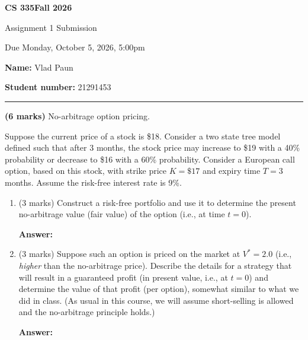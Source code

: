 \documentclass[11pt]{article}
\newcounter{problem}
\newenvironment{problem}{%
    \refstepcounter{problem}%
    \Needspace{7\baselineskip}%
    \par\vspace{0.7em}%
    \noindent\textcolor{courseblue}{\rule{\textwidth}{0.4pt}}%
    \par\vspace{0.5em}%
    \begin{list}{}{%
        \setlength{\leftmargin}{2.3em}%
        \setlength{\labelwidth}{1.8em}%
        \setlength{\labelsep}{0.5em}%
        \setlength{\topsep}{0pt}%
        \setlength{\partopsep}{0pt}%
    }%
    \item[\theproblem.]
}{\end{list}\par\vspace{0.5em}}
\newenvironment{parts}{%
    \begin{enumerate}[label=(\alph*),leftmargin=2.2em,itemsep=0.65em,topsep=0.65em]
}{\end{enumerate}}
\newenvironment{answer}{%
    \Needspace{4\baselineskip}%
    \par\vspace{0.35em}\noindent\textbf{Answer:}\par
}{\par\vspace{1.5em}}
\begin{document}
\begin{center}
    {\color{courseblue}\Large\textbf{CS 335}\hfill\textbf{Fall 2026}}

    \vspace{1.2em}
    {\color{courseblue}\Large Assignment 1 Submission}

    Due Monday, October 5, 2026, 5:00pm

    \vspace{0.8em}
    \textbf{Name:} Vlad Paun

    \textbf{Student number:} 21291453
\end{center}

\begin{problem}
\textbf{(6 marks)} No-arbitrage option pricing.

Suppose the current price of a stock is \$18. Consider a two state tree model defined such that
after 3 months, the stock price may increase to \$19 with a 40\% probability or decrease to \$16
with a 60\% probability. Consider a European call option, based on this stock, with strike price
$K=\$17$ and expiry time $T=3$ months. Assume the risk-free interest rate is 9\%.
\begin{parts}
\item (3 marks) Construct a risk-free portfolio and use it to determine the present no-arbitrage
value (fair value) of the option (i.e., at time $t=0$).
\begin{answer}
\end{answer}
\item (3 marks) Suppose such an option is priced on the market at $V^*=2.0$ (i.e., \emph{higher} than
the no-arbitrage price). Describe the details for a strategy that will result in a guaranteed
profit (in present value, i.e., at $t=0$) and determine the value of that profit (per option),
somewhat similar to what we did in class. (As usual in this course, we will assume short-selling
is allowed and the no-arbitrage principle holds.)
\begin{answer}
\end{answer}
\end{parts}
\end{problem}
\end{document}

